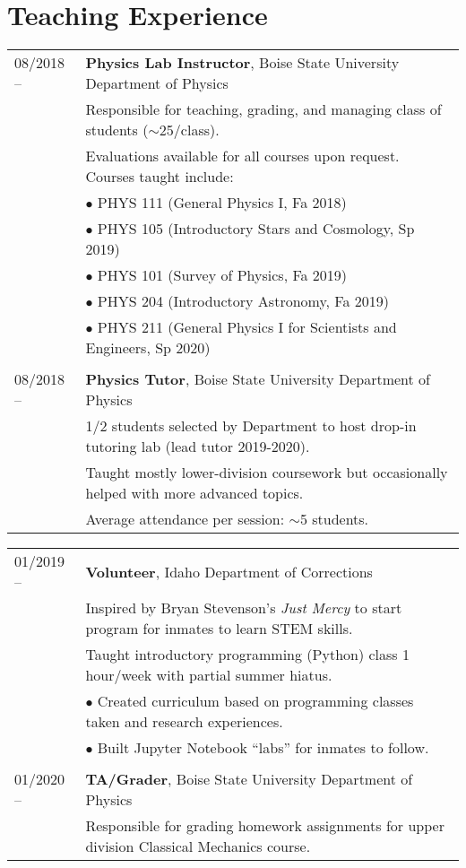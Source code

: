 \documentclass[11pt]{article}
\begin{document}
\section{Teaching Experience}
\begin{tabular}{ll}
08/2018 --		& 	\textbf{Physics Lab Instructor}, Boise State University Department of Physics \vspace{1mm} \\
      & Responsible for teaching, grading, and managing class of students ($\sim$25/class).\\
      & Evaluations available for all courses upon request. Courses taught include: \vspace{2mm} \\
      & $\bullet$ PHYS 111 (General Physics I, Fa 2018)\\
      & $\bullet$ PHYS 105 (Introductory Stars and Cosmology, Sp 2019)\\
      & $\bullet$ PHYS 101 (Survey of Physics, Fa 2019)\\
      & $\bullet$ PHYS 204 (Introductory Astronomy, Fa 2019)\\
      & $\bullet$ PHYS 211 (General Physics I for Scientists and Engineers, Sp 2020) \\
      & \\
08/2018 --    &   \textbf{Physics Tutor}, Boise State University Department of Physics \vspace{1mm} \\
      & 1/2 students selected by Department to host drop-in tutoring lab (lead tutor 2019-2020).\\
      & Taught mostly lower-division coursework but occasionally helped with more advanced topics.\\
      & Average attendance per session: $\sim$5 students.\\

\end{tabular}
\newpage
\begin{tabular}{ll}
01/2019 --    &   \textbf{Volunteer}, Idaho Department of Corrections \\
      & Inspired by Bryan Stevenson's \textit{Just Mercy} to start program for inmates to learn STEM skills.\vspace{2mm} \\
      & Taught introductory programming (Python) class 1 hour/week with partial summer hiatus.\\
      & $\bullet$ Created curriculum based on programming classes taken and research experiences.\\
      & $\bullet$ Built Jupyter Notebook ``labs'' for inmates to follow. \\
      & \\
01/2020 --    &   \textbf{TA/Grader}, Boise State University Department of Physics
\vspace{1mm} \\
      & Responsible for grading homework assignments for upper division Classical Mechanics course. \\
\end{tabular}
\end{document}

